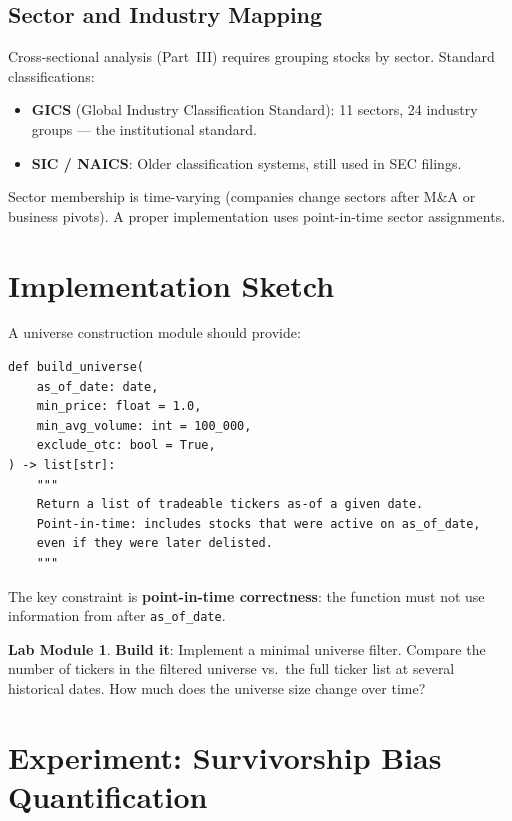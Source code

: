 \documentclass[a4paper, 11pt]{report}
\theoremstyle{definition}
\newtheorem{labmod}{Lab Module}[chapter]
\theoremstyle{remark}
\begin{document}
\subsection{Sector and Industry Mapping}

Cross-sectional analysis (Part~III) requires grouping stocks by sector.  Standard
classifications:

\begin{itemize}
    \item \textbf{GICS} (Global Industry Classification Standard): 11 sectors,
          24 industry groups --- the institutional standard.
    \item \textbf{SIC / NAICS}: Older classification systems, still used in SEC
          filings.
\end{itemize}

Sector membership is time-varying (companies change sectors after M\&A or
business pivots).  A proper implementation uses point-in-time sector assignments.

\section{Implementation Sketch}

A universe construction module should provide:

\begin{lstlisting}
def build_universe(
    as_of_date: date,
    min_price: float = 1.0,
    min_avg_volume: int = 100_000,
    exclude_otc: bool = True,
) -> list[str]:
    """
    Return a list of tradeable tickers as-of a given date.
    Point-in-time: includes stocks that were active on as_of_date,
    even if they were later delisted.
    """
\end{lstlisting}

The key constraint is \textbf{point-in-time correctness}: the function must not
use information from after \texttt{as\_of\_date}.

\begin{labmod}
    \textbf{Build it}: Implement a minimal universe filter.  Compare the number
    of tickers in the filtered universe vs.\ the full ticker list at several
    historical dates.  How much does the universe size change over time?
\end{labmod}

\section{Experiment: Survivorship Bias Quantification}
\end{document}
